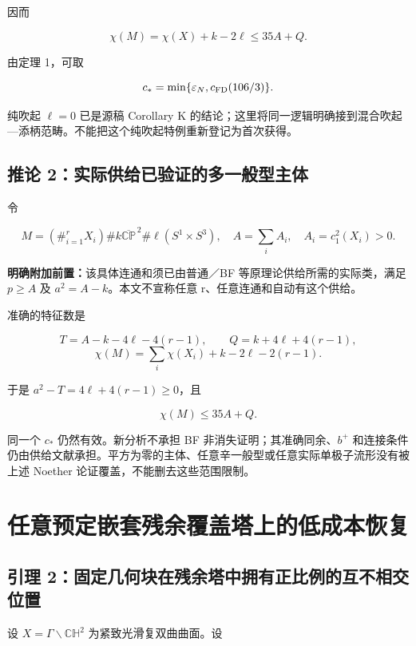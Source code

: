 \documentclass[UTF8,11pt,openany,fontset=none]{ctexbook}
\theoremstyle{definition}
\theoremstyle{remark}
\begin{document}
因而

\[
\chi(M)=\chi(X)+k-2\ell\le35A+Q.
\]

由定理 1，可取

\[
c_* =\min\{\varepsilon_N,c_{\rm FD}(106/3)\}.
\]

纯吹起 \(\ell=0\) 已是源稿 Corollary K 的结论；这里将同一逻辑明确接到混合吹起---添柄范畴。不能把这个纯吹起特例重新登记为首次获得。

\subsection{推论 2：实际供给已验证的多一般型主体}\label{v4-ux63a8ux8bba-2ux5b9eux9645ux4f9bux7ed9ux5df2ux9a8cux8bc1ux7684ux591aux4e00ux822cux578bux4e3bux4f53}

令

\[
M=(\#_{i=1}^{r}X_i)\#k\overline{\mathbb{CP}}^{\,2}
\#\ell(S^1\times S^3),
\quad A=\sum_i A_i,\quad A_i=c_1^2(X_i)>0.
\]

\textbf{明确附加前置：}该具体连通和须已由普通／BF 等原理论供给所需的实际类，满足 \(p\ge A\) 及 \(a^2=A-k\)。本文不宣称任意 r、任意连通和自动有这个供给。

准确的特征数是

\[
T=A-k-4\ell-4(r-1),\qquad
Q=k+4\ell+4(r-1),
\] \[
\chi(M)=\sum_i\chi(X_i)+k-2\ell-2(r-1).
\]

于是 \(a^2-T=4\ell+4(r-1)\ge0\)，且

\[
\chi(M)\le35A+Q.
\]

同一个 \(c_*\) 仍然有效。新分析不承担 BF 非消失证明；其准确同余、\(b^+\) 和连接条件仍由供给文献承担。平方为零的主体、任意辛一般型或任意实际单极子流形没有被上述 Noether 论证覆盖，不能删去这些范围限制。

\section{任意预定嵌套残余覆盖塔上的低成本恢复}\label{v4-ux4efbux610fux9884ux5b9aux5d4cux5957ux6b8bux4f59ux8986ux76d6ux5854ux4e0aux7684ux4f4eux6210ux672cux6062ux590d}

\subsection{引理 2：固定几何块在残余塔中拥有正比例的互不相交位置}\label{v4-ux5f15ux7406-2ux56faux5b9aux51e0ux4f55ux5757ux5728ux6b8bux4f59ux5854ux4e2dux62e5ux6709ux6b63ux6bd4ux4f8bux7684ux4e92ux4e0dux76f8ux4ea4ux4f4dux7f6e}

设 \(X=\Gamma\backslash\mathbb{CH}^2\) 为紧致光滑复双曲曲面。设
\end{document}
